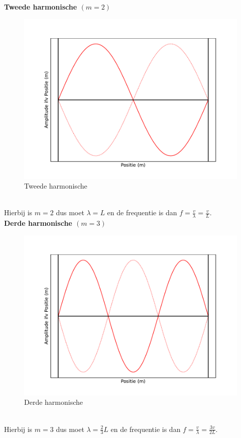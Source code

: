 \documentclass[a4paper,kul]{kulakarticle} %
\begin{document}
\newpage
\textbf{Tweede harmonische $(m = 2)$}\\
\begin{figure}[h]
	\centering
	\includegraphics[width=0.7\linewidth]{Tweede_harm}
	\caption[Tweede harmonische]{Tweede harmonische}
	\label{fig:tweedeharm}
\end{figure}\\
Hierbij is $m = 2$ dus moet $\lambda = L$ en de frequentie is dan $f = \frac{v}{\lambda} = \frac{v}{L}$.\\
\textbf{Derde harmonische $(m = 3)$}\\
\begin{figure}[h]
	\centering
	\includegraphics[width=0.7\linewidth]{Derde_harm}
	\caption[Derde harmonische]{Derde harmonische}
	\label{fig:Derdeharm}
\end{figure}\\
Hierbij is $m = 3$ dus moet $\lambda = \frac{2}{3}L$ en de frequentie is dan $f = \frac{v}{\lambda} = \frac{3v}{2L}$.\\
\newpage
\end{document}
